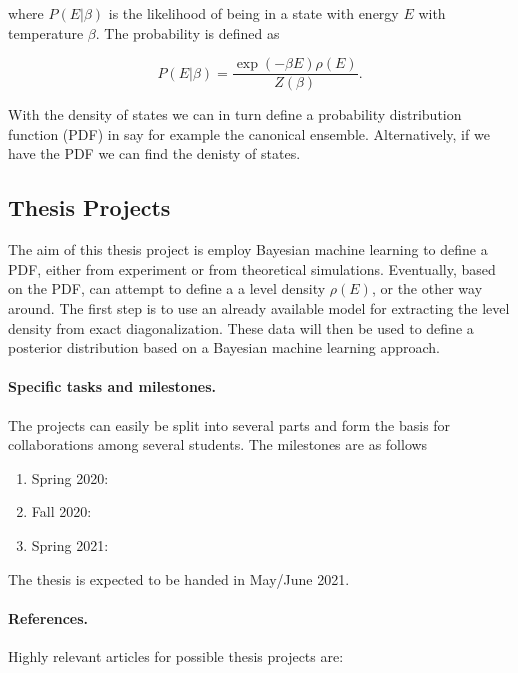 \documentclass[%
oneside,                 %
final,                   %
10pt]{article}
\begin{document}
where $P(E\vert\beta)$ is the likelihood of being in a state with
energy $E$ with temperature $\beta$. The probability is defined as

\[
P(E\vert\beta) = \frac{\exp{(-\beta E)}\rho(E)}{Z(\beta)}. 
\]

With the density of states we can in turn define a probability distribution function (PDF) in say for example the canonical ensemble. Alternatively, if we have the PDF we can find the denisty of states.




\subsection*{Thesis Projects}

The aim of this thesis project is employ Bayesian machine learning to
define a PDF, either from experiment or from theoretical simulations.
Eventually, based on the PDF, can attempt to define a a level density
$\rho(E)$, or the other way around. The first step is to use an
already available model for extracting the level density from exact
diagonalization. These data will then be used to define a posterior
distribution based on a Bayesian machine learning approach.






\paragraph{Specific tasks and milestones.}
The projects can easily be split into several parts and form the basis for collaborations among several students. The milestones are as follows
\begin{enumerate}
\item Spring 2020: 

\item Fall 2020: 

\item Spring 2021: 
\end{enumerate}

\noindent
The thesis is expected to be handed in May/June  2021.

\paragraph{References.}
Highly relevant articles for possible thesis projects are:


\end{document}

